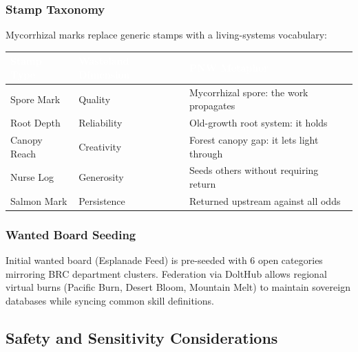 \documentclass[11pt,letterpaper]{article}
\newcommand{\tableheader}[1]{\textbf{\sffamily\textcolor{white}{#1}}}
\begin{document}
\subsubsection{Stamp Taxonomy}

Mycorrhizal marks replace generic stamps with a living-systems vocabulary:

\begin{center}
\begin{tabularx}{\textwidth}{L{3cm}L{3cm}X}
\toprule
{}
\tableheader{Stamp Type} & \tableheader{Wasteland Dimension} & \tableheader{PNW Metaphor} \\
\midrule
Spore Mark & Quality & Mycorrhizal spore: the work propagates \\
Root Depth & Reliability & Old-growth root system: it holds \\
Canopy Reach & Creativity & Forest canopy gap: it lets light through \\
Nurse Log & Generosity & Seeds others without requiring return \\
Salmon Mark & Persistence & Returned upstream against all odds \\
\bottomrule
\end{tabularx}
\end{center}

\subsubsection{Wanted Board Seeding}

Initial wanted board (Esplanade Feed) is pre-seeded with 6 open categories mirroring BRC department clusters. Federation via DoltHub allows regional virtual burns (Pacific Burn, Desert Bloom, Mountain Melt) to maintain sovereign databases while syncing common skill definitions.

\subsection{Safety and Sensitivity Considerations}
\end{document}
